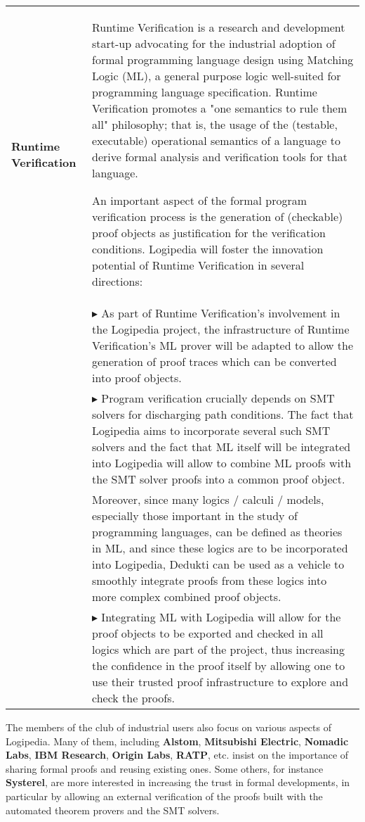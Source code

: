 \begin{longtable*}{|p{0.10\textwidth}|p{0.85\textwidth}|}
\hline

{\bf Runtime Verification} &

Runtime Verification is a research and development start-up advocating for the industrial
adoption of formal programming language design using Matching Logic (ML), a
general purpose logic well-suited for programming language specification.
Runtime Verification promotes a "one semantics to rule them all" philosophy; that is, the usage
of the (testable, executable) operational semantics of a language to derive
formal analysis and verification tools for that language.

An important aspect of the formal program verification process is the
generation of (checkable) proof objects as justification for the verification
conditions.
Logipedia will foster the innovation potential of Runtime Verification in several directions:\\
&
$\blacktriangleright$
As part of Runtime Verification's involvement in the Logipedia project, the infrastructure of 
Runtime Verification's ML prover will be adapted to allow the generation of proof traces which
can be converted into proof objects.
\\
&
$\blacktriangleright$
Program verification crucially depends on SMT solvers for discharging
path conditions. The fact that Logipedia aims to incorporate several such SMT
solvers and the fact that ML itself will be integrated into Logipedia will
allow to combine ML proofs with the SMT solver proofs into a common proof
object.\\

& Moreover, since many logics / calculi / models, especially those
important in the study of programming languages, can be defined as
theories in ML, and since these logics are to be incorporated into
Logipedia, Dedukti can be used as a vehicle to smoothly integrate
proofs from these logics into more complex combined proof objects.\\ &
$\blacktriangleright$ Integrating ML with Logipedia will allow for the
proof objects to be exported and checked in all logics which are part
of the project, thus increasing the confidence in the proof itself by
allowing one to use their trusted proof infrastructure to explore and
check the proofs.  \\ \hline
\end{longtable*}

The members of the club of industrial users also focus on various
aspects of Logipedia. Many of them, including {\bf Alstom}, {\bf
  Mitsubishi Electric}, {\bf Nomadic Labs}, {\bf IBM Research}, {\bf
  Origin Labs}, {\bf RATP}, etc.  insist on the importance of sharing
formal proofs and reusing existing ones.  Some others, for instance
{\bf Systerel}, are more interested in increasing the trust in formal
developments, in particular by allowing an external verification of
the proofs built with the automated theorem provers and the SMT solvers.

